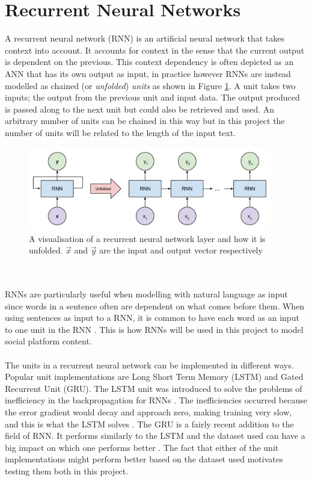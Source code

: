 \section{Recurrent Neural Networks }\label{sec:rnn}
A recurrent neural network (RNN) is an artificial neural network that takes context into account. It accounts for context in the sense that the current output is dependent on the previous. This context dependency is often depicted as an ANN that has its own output as input, in practice however RNNs are instead modelled as chained (or \textit{unfolded}) \textit{units} as shown in Figure \ref{fig:chained_units}. A unit takes two inputs; the output from the previous unit and input data. The output produced is passed along to the next unit but could also be retrieved and used. An arbitrary number of units can be chained in this way but in this project the number of units will be related to the length of the input text. 
\begin{figure}[h!]
    \centering
    \includegraphics[width=0.95\textwidth]{figure/ann/rnn_unfold}
    \caption{A visualisation of a recurrent neural network layer and how it is unfolded. $\vec{x}$ and $\vec{y}$ are the input and output vector respectively}
    \label{fig:chained_units}
\end{figure}
\\\\
RNNs are particularly useful when modelling with natural language as input since words in a sentence often are dependent on what comes before them. When using sentences as input to a RNN, it is common to have each word as an input to one unit in the RNN \parencite{palangi2016deep}. This is how RNNs will be used in this project to model social platform content.
\\\\
The units in a recurrent neural network can be implemented in different ways. Popular unit implementations are Long Short Term Memory (LSTM) and Gated Recurrent Unit (GRU). The LSTM unit was introduced to solve the problems of inefficiency in the backpropagation for RNNs \parencite{LSTMdefined}. The inefficiencies occurred because the error gradient would decay and approach zero, making training very slow, and this is what the LSTM solves \parencite{hochreiter1998vanishing}. The GRU is a fairly recent addition to the field of RNN. It performs similarly to the LSTM and the dataset used can have a big impact on which one performs better \parencite{GRUchung2014empirical}. The fact that either of the unit implementations might perform better based on the dataset used motivates testing them both in this project.

